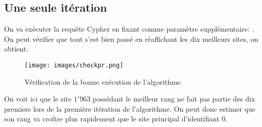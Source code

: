 \documentclass[12pt,twoside, openright]{memoir}
\newcommand{\courrier}[1]{{\fontfamily{qcr}\selectfont {#1}}}
\begin{document}
	\subsection{Une seule itération}
	On va exécuter la requête Cypher en fixant comme paramètre supplémentaire: \courrier{iterations: 1}. On peut vérifier que tout s'est bien passé en réaffichant les dix meilleurs sites, on obtient:
	\begin{figure}[!ht]
		\centering
		\texttt{[image: images/checkpr.png]}
		\caption{Vérification de la bonne exécution de l'algorithme}
	\end{figure}\par
	On voit ici que le site $1'963$ possédant le meilleur rang ne fait pas partie des dix premiers lors de la première itération de l'algorithme. On peut donc estimer que son rang va croître plus rapidement que le site principal d'identifiant 0.
\end{document}
